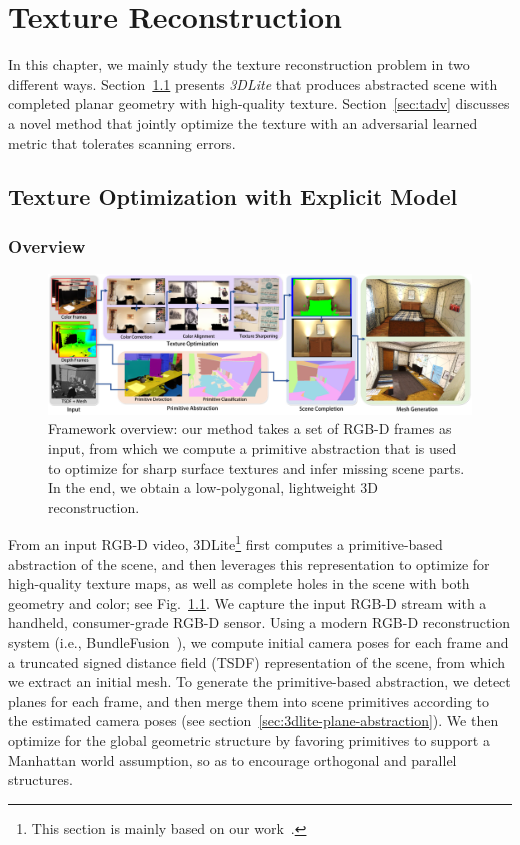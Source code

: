 \chapter{Texture Reconstruction}
\label{chapter:texture-recon}
In this chapter, we mainly study the texture reconstruction problem in two different ways. Section~\ref{sec:toptim} presents \emph{3DLite} that produces abstracted scene with completed planar geometry with high-quality texture. Section~\ref{sec:tadv} discusses a novel method that jointly optimize the texture with an adversarial learned metric that tolerates scanning errors.

\section{Texture Optimization with Explicit Model}
\label{sec:toptim}

\subsection{Overview}
\begin{figure}
	\centering
	\includegraphics[width=\textwidth]{3dlite/fig2.png}
	\caption{Framework overview: our method takes a set of RGB-D frames as input, from which we compute a primitive abstraction that is used to optimize for sharp surface textures and infer missing scene parts. In the end, we obtain a low-polygonal, lightweight 3D reconstruction.
	}
	\label{fig:3dlite-overview}
\end{figure}
From an input RGB-D video, 3DLite\footnote{This section is mainly based on our work~\cite{huang20173dlite}.} first computes a primitive-based abstraction of the scene, and then leverages this representation to optimize for high-quality texture maps, as well as complete holes in the scene with both geometry and color; see Fig.~\ref{fig:3dlite-overview}.
We capture the input RGB-D stream with a handheld, consumer-grade RGB-D sensor.
Using a modern RGB-D reconstruction system (i.e., BundleFusion~\cite{dai2016bundlefusion}), we compute initial camera poses for each frame and a truncated signed distance field (TSDF) representation of the scene, from which we extract an initial mesh.
To generate the primitive-based abstraction, we detect planes for each frame, and then merge them into scene primitives according to the estimated camera poses (see section~\ref{sec:3dlite-plane-abstraction}).
We then optimize for the global geometric structure by favoring primitives to support a Manhattan world assumption, so as to encourage orthogonal and parallel structures.

